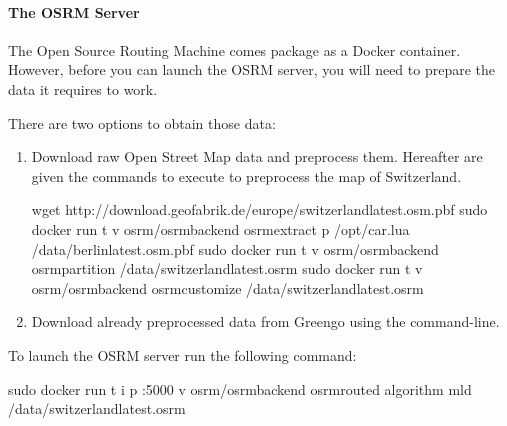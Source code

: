 \documentclass[letterpaper,10pt,english]{sphinxmanual}
\begin{document}
\paragraph{The OSRM Server}
\label{\detokenize{microservices/vehicle_localization/running:the-osrm-server}}
The Open Source Routing Machine comes package as a Docker container.
However, before you can launch the OSRM server, you will need to prepare the data it requires to work.

There are two options to obtain those data:
\begin{enumerate}
\def\theenumi{\arabic{enumi}}
\def\labelenumi{\theenumi .}
\makeatletter\def\p@enumii{\p@enumi \theenumi .}\makeatother
\item {} 
Download raw Open Street Map data and preprocess them.
Hereafter are given the commands to execute to preprocess the map of Switzerland.

\begin{sphinxVerbatim}[commandchars=\\\{\}]
wget http://download.geofabrik.de/europe/switzerland\PYGZhy{}latest.osm.pbf
sudo docker run \PYGZhy{}t \PYGZhy{}v  osrm/osrm\PYGZhy{}backend osrm\PYGZhy{}extract \PYGZhy{}p /opt/car.lua /data/berlin\PYGZhy{}latest.osm.pbf
sudo docker run \PYGZhy{}t \PYGZhy{}v  osrm/osrm\PYGZhy{}backend osrm\PYGZhy{}partition /data/switzerland\PYGZhy{}latest.osrm
sudo docker run \PYGZhy{}t \PYGZhy{}v  osrm/osrm\PYGZhy{}backend osrm\PYGZhy{}customize /data/switzerland\PYGZhy{}latest.osrm
\end{sphinxVerbatim}

\item {} 
Download already preprocessed data from Greengo using the  command-line.

\end{enumerate}

To launch the OSRM server run the following command:

\begin{sphinxVerbatim}[commandchars=\\\{\}]
sudo docker run \PYGZhy{}t \PYGZhy{}i \PYGZhy{}p :5000 \PYGZhy{}v  osrm/osrm\PYGZhy{}backend osrm\PYGZhy{}routed \PYGZhy{}\PYGZhy{}algorithm mld /data/switzerland\PYGZhy{}latest.osrm
\end{sphinxVerbatim}
\end{document}
